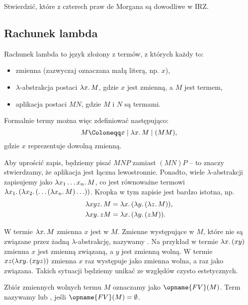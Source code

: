 \documentclass[polish,pretty]{angav}
\newcommand{\FV}{\opname{FV}}
\begin{document}
\begin{problem}
    Stwierdzić, które z czterech praw de Morgana są dowodliwe w IRZ.
\end{problem}

\subsection{Rachunek lambda}

Rachunek lambda to język złożony z termów, z których każdy to:
\begin{itemize}
    \item zmienna (zazwyczaj oznaczana małą literą, np. $x$),
    \item $\lambda$-abstrakcja postaci $\lambda x\ldotp M$, gdzie $x$ jest zmienną, a $M$ jest termem,
    \item aplikacja postaci $MN$, gdzie $M$ i $N$ są termami.
\end{itemize}

Formalnie termy można więc zdefiniować następująco:
\[ M \Coloneqq x \mid \lambda x\ldotp M \mid (MM), \]
gdzie $x$ reprezentuje dowolną zmienną.

Aby uprościć zapis, będziemy pisać $MNP$ zamiast $(MN)P$ -- to znaczy stwierdzamy, że aplikacja jest łączna lewostronnie. Ponadto, wiele $\lambda$-abstrakcji zapisujemy jako $\lambda x_1 \ldots x_n\ldotp M$, co jest równoważne termowi $\lambda x_1\ldotp (\lambda x_2\ldotp (\ldots (\lambda x_n\ldotp M) \ldots))$. Kropka w tym zapisie jest bardzo istotna, np.
\begin{align*}
    \lambda xyz\ldotp M &= \lambda x\ldotp (\lambda y\ldotp (\lambda z\ldotp M)), \\
    \lambda xy\ldotp z M &= \lambda x\ldotp (\lambda y\ldotp (z M)).
\end{align*}

W termie $\lambda x\ldotp M$ zmienna $x$ jest  w $M$.
Zmienne występujące w $M$, które nie są związane przez żadną $\lambda$-abstrakcję, nazywamy .
Na przykład w termie $\lambda x\ldotp (x y)$ zmienna $x$ jest zmienną związaną, a $y$ jest zmienną wolną.
W termie $xz(\lambda xy\ldotp (xyz))$ zmienna $x$ raz występuje jako zmienna wolna, a raz jako związana. Takich sytuacji będziemy unikać ze względów czysto estetycznych.

Zbiór zmiennych wolnych termu $M$ oznaczamy jako $\FV(M)$.
Term nazywamy  lub , jeśli $\FV(M) = \emptyset$.
\end{document}
